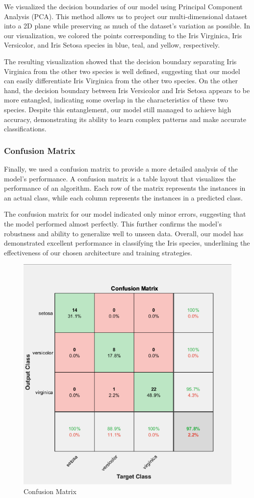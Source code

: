 \documentclass[conference]{inc/IEEEtran}
\begin{document}
We visualized the decision boundaries of our model using Principal Component Analysis (PCA). This method allows us to project our multi-dimensional dataset into a 2D plane while preserving as much of the dataset's variation as possible. In our visualization, we colored the points corresponding to the Iris Virginica, Iris Versicolor, and Iris Setosa species in blue, teal, and yellow, respectively.

The resulting visualization showed that the decision boundary separating Iris Virginica from the other two species is well defined, suggesting that our model can easily differentiate Iris Virginica from the other two species. On the other hand, the decision boundary between Iris Versicolor and Iris Setosa appears to be more entangled, indicating some overlap in the characteristics of these two species. Despite this entanglement, our model still managed to achieve high accuracy, demonstrating its ability to learn complex patterns and make accurate classifications.



\subsubsection{Confusion Matrix}

Finally, we used a confusion matrix to provide a more detailed analysis of the model's performance. A confusion matrix is a table layout that visualizes the performance of an algorithm. Each row of the matrix represents the instances in an actual class, while each column represents the instances in a predicted class.

The confusion matrix for our model indicated only minor errors, suggesting that the model performed almost perfectly. This further confirms the model's robustness and ability to generalize well to unseen data. Overall, our model has demonstrated excellent performance in classifying the Iris species, underlining the effectiveness of our chosen architecture and training strategies.


\begin{figure}
  \includegraphics[width=0.7\linewidth]{figures/Cm.png}
  \caption{Confusion Matrix}
  \label{fig:boat1}
\end{figure}
\end{document}
